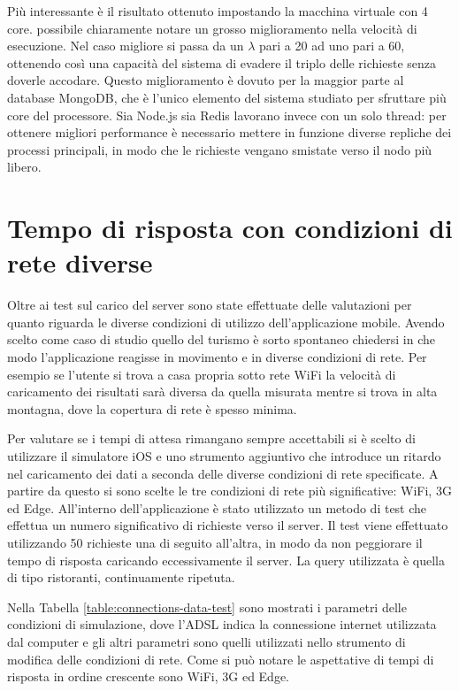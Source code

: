 Più interessante è il risultato ottenuto impostando la macchina virtuale con 4 core. \upe possibile chiaramente notare un grosso miglioramento nella velocità di esecuzione. Nel caso migliore si passa da un $ \lambda $ pari a 20 ad uno pari a 60, ottenendo così una capacità del sistema di evadere il triplo delle richieste senza doverle accodare. Questo miglioramento è dovuto per la maggior parte al database MongoDB, che è l'unico elemento del sistema studiato per sfruttare più core del processore. Sia Node.js sia Redis lavorano invece con un solo thread: per ottenere migliori performance è necessario mettere in funzione diverse repliche dei processi principali, in modo che le richieste vengano smistate verso il nodo più libero.

\section{Tempo di risposta con condizioni di rete diverse\label{sec:analisi-condizioni-rete}}

Oltre ai test sul carico del server sono state effettuate delle valutazioni per quanto riguarda le diverse condizioni di utilizzo dell'applicazione mobile. Avendo scelto come caso di studio quello del turismo è sorto spontaneo chiedersi in che modo l'applicazione reagisse in movimento e in diverse condizioni di rete. Per esempio se l'utente si trova a casa propria sotto rete WiFi la velocità di caricamento dei risultati sarà diversa da quella misurata mentre si trova in alta montagna, dove la copertura di rete è spesso minima.

Per valutare se i tempi di attesa rimangano sempre accettabili si è scelto di utilizzare il simulatore iOS e uno strumento aggiuntivo che introduce un ritardo nel caricamento dei dati a seconda delle diverse condizioni di rete specificate. A partire da questo si sono scelte le tre condizioni di rete più significative: WiFi, 3G ed Edge.
All'interno dell'applicazione è stato utilizzato un metodo di test che effettua un numero significativo di richieste verso il server. Il test viene effettuato utilizzando 50 richieste una di seguito all'altra, in modo da non peggiorare il tempo di risposta caricando eccessivamente il server. La query utilizzata è quella di tipo ristoranti, continuamente ripetuta.

Nella Tabella \ref{table:connections-data-test} sono mostrati i parametri delle condizioni di simulazione, dove l'ADSL indica la connessione internet utilizzata dal computer e gli altri parametri sono quelli utilizzati nello strumento di modifica delle condizioni di rete. Come si può notare le aspettative di tempi di risposta in ordine crescente sono WiFi, 3G ed Edge.

